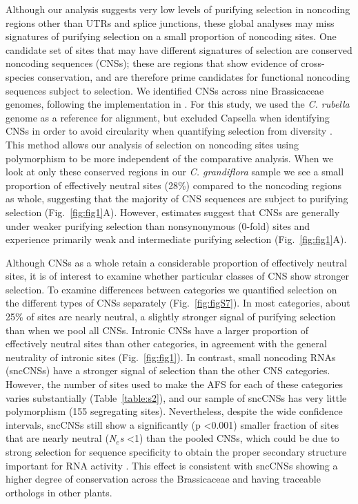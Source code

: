 Although our analysis suggests very low levels of purifying selection in noncoding regions other than UTRs and splice junctions, these global analyses may miss signatures of purifying selection on a small proportion of noncoding sites. One candidate set of sites that may have different signatures of selection are conserved noncoding sequences (CNSs); these are regions that show evidence of cross-species conservation, and are therefore prime candidates for functional noncoding sequences subject to selection. We identified CNSs across nine Brassicaceae genomes, following the implementation in \citet{Haudry2013-qe}. For this study, we used the \textit{C. rubella} genome as a reference for alignment, but excluded Capsella when identifying CNSs in order to avoid circularity when quantifying selection from diversity \citep{Halligan2013}. This method allows our analysis of selection on noncoding sites using polymorphism to be more independent of the comparative analysis. When we look at only these conserved regions in our \textit{C. grandiflora} sample we see a small proportion of effectively neutral sites (28\%) compared to the noncoding regions as whole, suggesting that the majority of CNS sequences are subject to purifying selection (Fig.~\ref{fig:fig1}A). However, estimates suggest that CNSs are generally under weaker purifying selection than nonsynonymous (0-fold) sites and experience primarily weak and intermediate purifying selection (Fig.~\ref{fig:fig1}A). 

Although CNSs as a whole retain a considerable proportion of effectively neutral sites, it is of interest to examine whether particular classes of CNS show stronger selection. To examine differences between categories we quantified selection on the different types of CNSs separately (Fig.~\ref{fig:figS7}). In most categories, about 25\% of sites are nearly neutral, a slightly stronger signal of purifying selection than when we pool all CNSs. Intronic CNSs have a larger proportion of effectively neutral sites than other categories, in agreement with the general neutrality of intronic sites (Fig.~\ref{fig:fig1}). In contrast, small noncoding RNAs (sncCNSs) have a stronger signal of selection than the other CNS categories. However, the number of sites used to make the AFS for each of these categories varies substantially (Table~\ref{table:s2}), and our sample of sncCNSs has very little polymorphism (155 segregating sites). Nevertheless, despite the wide confidence intervals, sncCNSs still show a significantly (p \textless 0.001) smaller fraction of sites that are nearly neutral (\textit{N$_{e}$s} \textless 1) than the pooled CNSs, which could be due to strong selection for sequence specificity to obtain the proper secondary structure important for RNA activity \citep{ehrenreich2008}. This effect is consistent with sncCNSs showing a higher degree of conservation across the Brassicaceae \citep{Haudry2013-qe} and having traceable orthologs in other plants.


